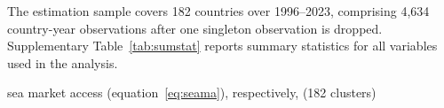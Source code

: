 

The estimation sample covers 182 countries over 1996--2023, comprising 4,634 country-year observations after one singleton observation is dropped. Supplementary Table~\ref{tab:sumstat} reports summary statistics for all variables used in the analysis.


sea market access (equation~\ref{eq:seama}), respectively,
(182 clusters)



